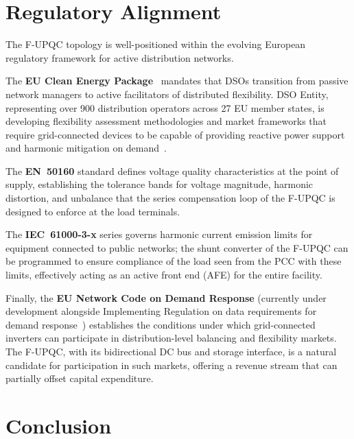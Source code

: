 \documentclass[conference]{IEEEtran}
\begin{document}

\section{Regulatory Alignment}
\label{sec:regulatory}

The F-UPQC topology is well-positioned within the evolving European
regulatory framework for active distribution networks.

The \textbf{EU Clean Energy Package}~\cite{ref:CEP} mandates that DSOs
transition from passive network managers to active facilitators of
distributed flexibility. DSO Entity, representing over 900 distribution
operators across 27 EU member states, is developing flexibility
assessment methodologies and market frameworks that require
grid-connected devices to be capable of providing reactive power
support and harmonic mitigation on demand~\cite{ref:EDSO_transition}.

The \textbf{EN~50160} standard defines voltage quality characteristics
at the point of supply, establishing the tolerance bands for voltage
magnitude, harmonic distortion, and unbalance that the series
compensation loop of the F-UPQC is designed to enforce at the load
terminals.

The \textbf{IEC~61000-3-x} series governs harmonic current emission
limits for equipment connected to public networks; the shunt
converter of the F-UPQC can be programmed to ensure compliance of
the load seen from the PCC with these limits, effectively acting
as an active front end (AFE) for the entire facility.

Finally, the \textbf{EU Network Code on Demand Response} (currently
under development alongside Implementing Regulation on data
requirements for demand response~\cite{ref:CEP}) establishes the
conditions under which grid-connected inverters can participate in
distribution-level balancing and flexibility markets. The F-UPQC,
with its bidirectional DC bus and storage interface, is a natural
candidate for participation in such markets, offering a revenue
stream that can partially offset capital expenditure.


\section{Conclusion}
\label{sec:conclusion}
\end{document}
